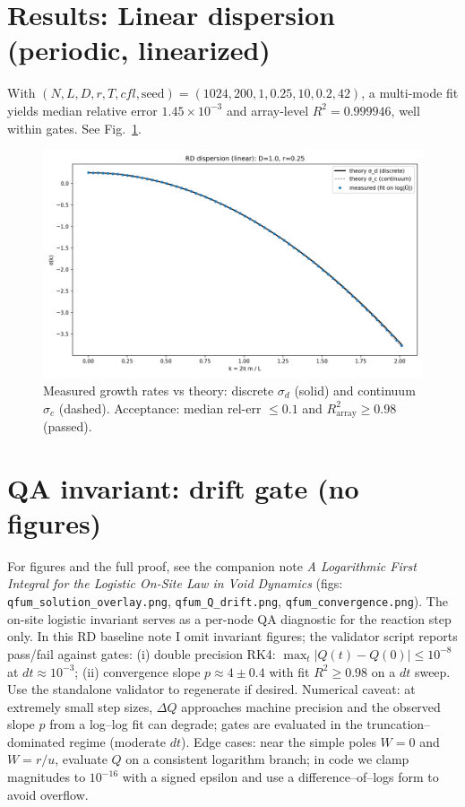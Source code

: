 \documentclass[11pt]{article}
\begin{document}
\section{Results: Linear dispersion (periodic, linearized)}
With $(N,L,D,r,T,cfl,\text{seed})=(1024,200,1,0.25,10,0.2,42)$, a multi-mode fit yields median relative error $1.45\times 10^{-3}$ and array-level $R^2=0.999946$, well within gates. See Fig.~\ref{fig:disp}.

\begin{figure}[t]
\centering
\includegraphics[width=0.9\linewidth]{figs/rd_dispersion.png}
\caption{Measured growth rates vs theory: discrete $\sigma_d$ (solid) and continuum $\sigma_c$ (dashed). Acceptance: median rel-err $\le 0.1$ and $R^2_{\text{array}}\ge 0.98$ (passed).}
\label{fig:disp}
\end{figure}

\section{QA invariant: drift gate (no figures)}
For figures and the full proof, see the companion note \emph{A Logarithmic First Integral for the Logistic On-Site Law in Void Dynamics} (figs: \texttt{qfum\_solution\_overlay.png}, \texttt{qfum\_Q\_drift.png}, \texttt{qfum\_convergence.png}).
The on-site logistic invariant serves as a per-node QA diagnostic for the reaction step only. In this RD baseline note I omit invariant figures; the validator script reports pass/fail against gates:
(i) double precision RK4: $\max_t |Q(t)-Q(0)| \le 10^{-8}$ at $dt\approx 10^{-3}$; (ii) convergence slope $p\approx 4\pm 0.4$ with fit $R^2\ge 0.98$ on a $dt$ sweep. Use the standalone validator to regenerate if desired. Numerical caveat: at extremely small step sizes, $\Delta Q$ approaches machine precision and the observed slope $p$ from a log--log fit can degrade; gates are evaluated in the truncation--dominated regime (moderate $dt$). Edge cases: near the simple poles $W=0$ and $W=r/u$, evaluate $Q$ on a consistent logarithm branch; in code we clamp magnitudes to $10^{-16}$ with a signed epsilon and use a difference--of--logs form to avoid overflow.
\end{document}
